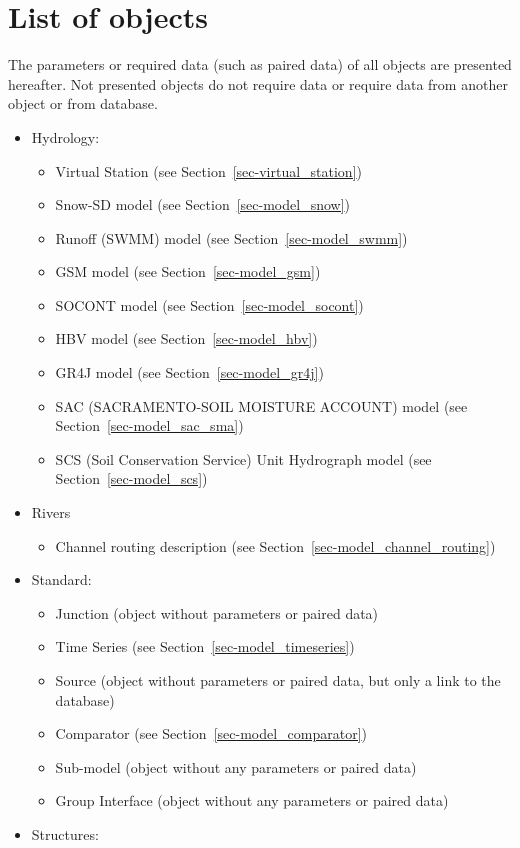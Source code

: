 \documentclass[
  letterpaper,
  DIV=11,
  numbers=noendperiod]{scrreprt}
\providecommand{\tightlist}{%
  \setlength{\itemsep}{0pt}\setlength{\parskip}{0pt}}\usepackage{longtable,booktabs,array}
\begin{document}
\hypertarget{list-of-objects}{%
\chapter{List of objects}\label{list-of-objects}}

The parameters or required data (such as paired data) of all objects are
presented hereafter. Not presented objects do not require data or
require data from another object or from database.

\begin{itemize}
\item
  Hydrology:

  \begin{itemize}
  \item
    Virtual Station (see Section~\ref{sec-virtual_station})
  \item
    Snow-SD model (see Section~\ref{sec-model_snow})
  \item
    Runoff (SWMM) model (see Section~\ref{sec-model_swmm})
  \item
    GSM model (see Section~\ref{sec-model_gsm})
  \item
    SOCONT model (see Section~\ref{sec-model_socont})
  \item
    HBV model (see Section~\ref{sec-model_hbv})
  \item
    GR4J model (see Section~\ref{sec-model_gr4j})
  \item
    SAC (SACRAMENTO-SOIL MOISTURE ACCOUNT) model (see
    Section~\ref{sec-model_sac_sma})
  \item
    SCS (Soil Conservation Service) Unit Hydrograph model (see
    Section~\ref{sec-model_scs})
  \end{itemize}
\item
  Rivers

  \begin{itemize}
  \tightlist
  \item
    Channel routing description (see
    Section~\ref{sec-model_channel_routing})
  \end{itemize}
\item
  Standard:

  \begin{itemize}
  \item
    Junction (object without parameters or paired data)
  \item
    Time Series (see Section~\ref{sec-model_timeseries})
  \item
    Source (object without parameters or paired data, but only a link to
    the database)
  \item
    Comparator (see Section~\ref{sec-model_comparator})
  \item
    Sub-model (object without any parameters or paired data)
  \item
    Group Interface (object without any parameters or paired data)
  \end{itemize}
\item
  Structures:


\end{itemize}
\end{document}
